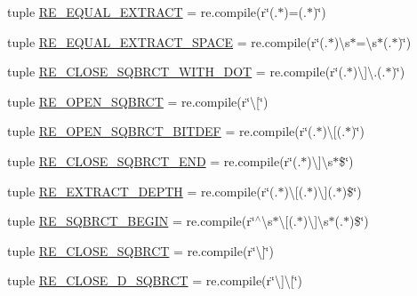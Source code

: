 \begin{DoxyCompactItemize}
\item 
tuple \hyperlink{namespacesrc_1_1regex_a1c029933418650ab4a76a602b9a39782}{R\-E\-\_\-\-E\-Q\-U\-A\-L\-\_\-\-E\-X\-T\-R\-A\-C\-T} = re.\-compile(r\char`\"{}(.$\ast$)=(.$\ast$)\char`\"{})
\item 
tuple \hyperlink{namespacesrc_1_1regex_af819a98bbdc42520bdb567e879887969}{R\-E\-\_\-\-E\-Q\-U\-A\-L\-\_\-\-E\-X\-T\-R\-A\-C\-T\-\_\-\-S\-P\-A\-C\-E} = re.\-compile(r\char`\"{}(.$\ast$)\textbackslash{}s$\ast$=\textbackslash{}s$\ast$(.$\ast$)\char`\"{})
\item 
tuple \hyperlink{namespacesrc_1_1regex_a733717dbc576a717f902b0fe9eb8fd15}{R\-E\-\_\-\-C\-L\-O\-S\-E\-\_\-\-S\-Q\-B\-R\-C\-T\-\_\-\-W\-I\-T\-H\-\_\-\-D\-O\-T} = re.\-compile(r\char`\"{}(.$\ast$)\textbackslash{}\mbox{]}\textbackslash{}.(.$\ast$)\char`\"{})
\item 
tuple \hyperlink{namespacesrc_1_1regex_a18272676c1783d071c15bb1588a48752}{R\-E\-\_\-\-O\-P\-E\-N\-\_\-\-S\-Q\-B\-R\-C\-T} = re.\-compile(r\char`\"{}\textbackslash{}\mbox{[}\char`\"{})
\item 
tuple \hyperlink{namespacesrc_1_1regex_af6ea0ac7329ac12f030437327f23ee04}{R\-E\-\_\-\-O\-P\-E\-N\-\_\-\-S\-Q\-B\-R\-C\-T\-\_\-\-B\-I\-T\-D\-E\-F} = re.\-compile(r\char`\"{}(.$\ast$)\textbackslash{}\mbox{[}(.$\ast$)\char`\"{})
\item 
tuple \hyperlink{namespacesrc_1_1regex_a7d53107007745155a209a47972ce6457}{R\-E\-\_\-\-C\-L\-O\-S\-E\-\_\-\-S\-Q\-B\-R\-C\-T\-\_\-\-E\-N\-D} = re.\-compile(r\char`\"{}(.$\ast$)\textbackslash{}\mbox{]}\textbackslash{}s$\ast$\$\char`\"{})
\item 
tuple \hyperlink{namespacesrc_1_1regex_a3c7a6afd9cf2804f061f0bed11a0c77d}{R\-E\-\_\-\-E\-X\-T\-R\-A\-C\-T\-\_\-\-D\-E\-P\-T\-H} = re.\-compile(r\char`\"{}(.$\ast$)\textbackslash{}\mbox{[}(.$\ast$)\textbackslash{}\mbox{]}(.$\ast$)\$\char`\"{})
\item 
tuple \hyperlink{namespacesrc_1_1regex_a0f26ec043d2d37bb5138bd65f4164a9f}{R\-E\-\_\-\-S\-Q\-B\-R\-C\-T\-\_\-\-B\-E\-G\-I\-N} = re.\-compile(r\char`\"{}$^\wedge$\textbackslash{}s$\ast$\textbackslash{}\mbox{[}(.$\ast$)\textbackslash{}\mbox{]}\textbackslash{}s$\ast$(.$\ast$)\$\char`\"{})
\item 
tuple \hyperlink{namespacesrc_1_1regex_aaf5f8dbccd7de768ff3a216025040fbb}{R\-E\-\_\-\-C\-L\-O\-S\-E\-\_\-\-S\-Q\-B\-R\-C\-T} = re.\-compile(r\char`\"{}\textbackslash{}\mbox{]}\char`\"{})
\item 
tuple \hyperlink{namespacesrc_1_1regex_a1ed7c9be7f7df2a48bc80dc2c5bd71d9}{R\-E\-\_\-\-C\-L\-O\-S\-E\-\_\-D\-\_\-\-S\-Q\-B\-R\-C\-T} = re.\-compile(r\char`\"{}\textbackslash{}\mbox{]}\textbackslash{}\mbox{[}\char`\"{})

\end{DoxyCompactItemize}
